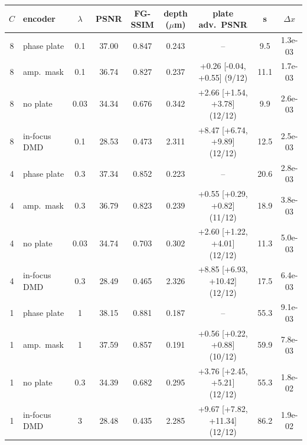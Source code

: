 \begin{tabular}{@{}cl c ccc c c c@{}}\toprule
$C$ & encoder & $\lambda$ & PSNR & FG-SSIM & depth ($\mu$m) & plate adv.\ PSNR & s & $\Delta x$\\\midrule
8 & phase plate & 0.1 & 37.00 & 0.847 & 0.243 & -- & 9.5 & 1.3e-03\\
8 & amp.\ mask & 0.1 & 36.74 & 0.827 & 0.237 & +0.26 [-0.04, +0.55] (9/12) & 11.1 & 1.7e-03\\
8 & no plate & 0.03 & 34.34 & 0.676 & 0.342 & +2.66 [+1.54, +3.78] (12/12) & 9.9 & 2.6e-03\\
8 & in-focus DMD & 0.1 & 28.53 & 0.473 & 2.311 & +8.47 [+6.74, +9.89] (12/12) & 12.5 & 2.5e-03\\
4 & phase plate & 0.3 & 37.34 & 0.852 & 0.223 & -- & 20.6 & 2.8e-03\\
4 & amp.\ mask & 0.3 & 36.79 & 0.823 & 0.239 & +0.55 [+0.29, +0.82] (11/12) & 18.9 & 3.8e-03\\
4 & no plate & 0.03 & 34.74 & 0.703 & 0.302 & +2.60 [+1.22, +4.01] (12/12) & 11.3 & 5.0e-03\\
4 & in-focus DMD & 0.3 & 28.49 & 0.465 & 2.326 & +8.85 [+6.93, +10.42] (12/12) & 17.5 & 6.4e-03\\
1 & phase plate & 1 & 38.15 & 0.881 & 0.187 & -- & 55.3 & 9.1e-03\\
1 & amp.\ mask & 1 & 37.59 & 0.857 & 0.191 & +0.56 [+0.22, +0.88] (10/12) & 59.9 & 7.8e-03\\
1 & no plate & 0.3 & 34.39 & 0.682 & 0.295 & +3.76 [+2.45, +5.21] (12/12) & 55.3 & 1.8e-02\\
1 & in-focus DMD & 3 & 28.48 & 0.435 & 2.285 & +9.67 [+7.82, +11.34] (12/12) & 86.2 & 1.9e-02\\
\bottomrule\end{tabular}
